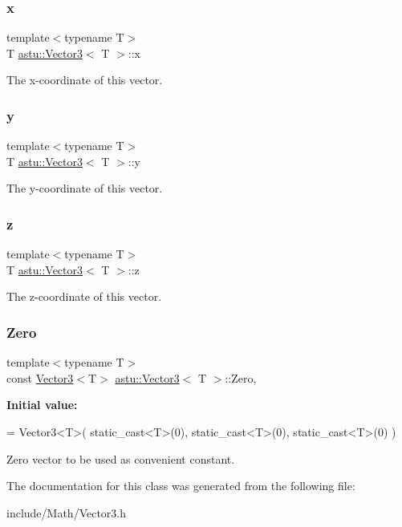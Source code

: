 \subsubsection{\texorpdfstring{x}{x}}
{\footnotesize\ttfamily template$<$typename T$>$ \\
T \hyperlink{classastu_1_1Vector3}{astu\+::\+Vector3}$<$ T $>$\+::x}

The x-\/coordinate of this vector. \mbox{\label{classastu_1_1Vector3_a72a148e22a4d8f032800b5bea1f7c963}} 
\subsubsection{\texorpdfstring{y}{y}}
{\footnotesize\ttfamily template$<$typename T$>$ \\
T \hyperlink{classastu_1_1Vector3}{astu\+::\+Vector3}$<$ T $>$\+::y}

The y-\/coordinate of this vector. \mbox{\label{classastu_1_1Vector3_a123e70de5cfb25f1c892e624efec50bc}} 
\subsubsection{\texorpdfstring{z}{z}}
{\footnotesize\ttfamily template$<$typename T$>$ \\
T \hyperlink{classastu_1_1Vector3}{astu\+::\+Vector3}$<$ T $>$\+::z}

The z-\/coordinate of this vector. \mbox{\label{classastu_1_1Vector3_ab5a825733eacd6996135dfb5d561b2e4}} 
\subsubsection{\texorpdfstring{Zero}{Zero}}
{\footnotesize\ttfamily template$<$typename T$>$ \\
const \hyperlink{classastu_1_1Vector3}{Vector3}$<$T$>$ \hyperlink{classastu_1_1Vector3}{astu\+::\+Vector3}$<$ T $>$\+::Zero\hspace{0.3cm}{\ttfamily [inline]}, {\ttfamily [static]}}

{\bfseries Initial value\+:}
\begin{DoxyCode}
= Vector3<T>(
            \textcolor{keyword}{static\_cast<}T\textcolor{keyword}{>}(0), 
            static\_cast<T>(0), 
            \textcolor{keyword}{static\_cast<}T\textcolor{keyword}{>}(0)
        )
\end{DoxyCode}
Zero vector to be used as convenient constant. 

The documentation for this class was generated from the following file\+:\begin{DoxyCompactItemize}
\item 
include/\+Math/Vector3.\+h\end{DoxyCompactItemize}
